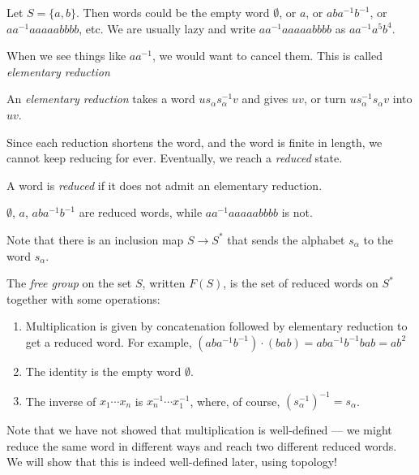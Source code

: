 \documentclass[a4paper]{article}
\begin{document}
\begin{eg}
  Let $S = \{a, b\}$. Then words could be the empty word $\emptyset$, or $a$, or $aba^{-1}b^{-1}$, or $aa^{-1}aaaaabbbb$, etc. We are usually lazy and write $aa^{-1}aaaaabbbb$ as $aa^{-1}a^5 b^4$.
\end{eg}

When we see things like $aa^{-1}$, we would want to cancel them. This is called \emph{elementary reduction}
\begin{defi}
  An \emph{elementary reduction} takes a word $us_\alpha s_\alpha^{-1}v$ and gives $uv$, or turn $us_\alpha^{-1}s_\alpha v$ into $uv$.
\end{defi}
Since each reduction shortens the word, and the word is finite in length, we cannot keep reducing for ever. Eventually, we reach a \emph{reduced} state.

\begin{defi}
  A word is \emph{reduced} if it does not admit an elementary reduction.
\end{defi}

\begin{eg}
  $\emptyset$, $a$, $aba^{-1}b^{-1}$ are reduced words, while $aa^{-1}aaaaabbbb$ is not.
\end{eg}
Note that there is an inclusion map $S \to S^*$ that sends the alphabet $s_\alpha$ to the word $s_\alpha$.

\begin{defi}
  The \emph{free group} on the set $S$, written $F(S)$, is the set of reduced words on $S^*$ together with some operations:
  \begin{enumerate}
    \item Multiplication is given by concatenation followed by elementary reduction to get a reduced word. For example, $(aba^{-1}b^{-1}) \cdot (bab) = aba^{-1}b^{-1}bab = ab^2$
    \item The identity is the empty word $\emptyset$.
    \item The inverse of $x_1\cdots x_n$ is $x_n^{-1}\cdots x_1^{-1}$, where, of course, $(s_\alpha^{-1})^{-1} = s_\alpha$.
  \end{enumerate}
\end{defi}
Note that we have not showed that multiplication is well-defined --- we might reduce the same word in different ways and reach two different reduced words. We will show that this is indeed well-defined later, using topology!
\end{document}

